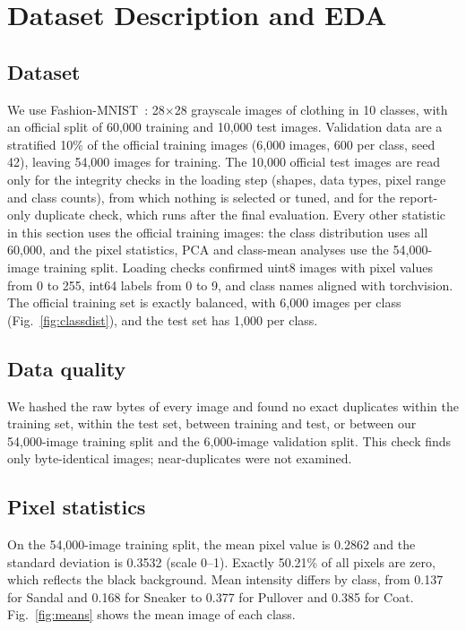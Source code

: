 \section{Dataset Description and EDA}
\label{sec:dataset}

\subsection{Dataset}
We use Fashion-MNIST~\cite{xiao2017fashion}: 28$\times$28 grayscale images of clothing in 10 classes, with an official split of 60{,}000 training and 10{,}000 test images. Validation data are a stratified 10\% of the official training images (6{,}000 images, 600 per class, seed 42), leaving 54{,}000 images for training. The 10{,}000 official test images are read only for the integrity checks in the loading step (shapes, data types, pixel range and class counts), from which nothing is selected or tuned, and for the report-only duplicate check, which runs after the final evaluation. Every other statistic in this section uses the official training images: the class distribution uses all 60{,}000, and the pixel statistics, PCA and class-mean analyses use the 54{,}000-image training split. Loading checks confirmed uint8 images with pixel values from 0 to 255, int64 labels from 0 to 9, and class names aligned with torchvision. The official training set is exactly balanced, with 6{,}000 images per class (Fig.~\ref{fig:classdist}), and the test set has 1{,}000 per class.

\subsection{Data quality}
We hashed the raw bytes of every image and found no exact duplicates within the training set, within the test set, between training and test, or between our 54{,}000-image training split and the 6{,}000-image validation split. This check finds only byte-identical images; near-duplicates were not examined.

\subsection{Pixel statistics}
On the 54{,}000-image training split, the mean pixel value is 0.2862 and the standard deviation is 0.3532 (scale 0--1). Exactly 50.21\% of all pixels are zero, which reflects the black background. Mean intensity differs by class, from 0.137 for Sandal and 0.168 for Sneaker to 0.377 for Pullover and 0.385 for Coat. Fig.~\ref{fig:means} shows the mean image of each class.

